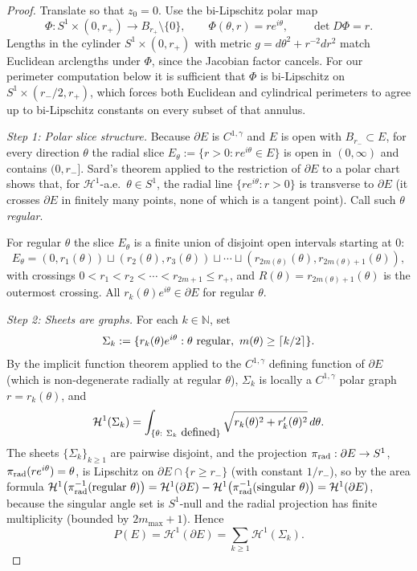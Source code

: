 \documentclass[11pt]{amsart}
\newcommand{\N}{\mathbb N}
\newcommand{\HH}{\mathcal H}
\begin{document}
\begin{proof}
Translate so that \(z_0=0\).  Use the bi-Lipschitz polar map
\[
   \Phi:S^1\times(0,r_+)\to B_{r_+}\setminus\{0\},
   \qquad
   \Phi(\theta,r)=re^{i\theta},
   \qquad
   \det D\Phi=r.
\]
Lengths in the cylinder \(S^1\times(0,r_+)\) with metric
\(g=d\theta^2+r^{-2}dr^2\) match Euclidean arclengths under \(\Phi\),
since the Jacobian factor cancels.  For our perimeter computation
below it is sufficient that \(\Phi\) is bi-Lipschitz on
\(S^1\times(r_-/2,r_+)\), which forces both Euclidean and cylindrical
perimeters to agree up to bi-Lipschitz constants on every subset of
that annulus.

\emph{Step 1: Polar slice structure.}  Because \(\partial E\) is
\(C^{1,\gamma}\) and \(E\) is open with \(B_{r_-}\subset E\), for every
direction \(\theta\) the radial slice \(E_\theta:=
\{r>0:re^{i\theta}\in E\}\) is open in \((0,\infty)\) and contains
\((0,r_-]\).  Sard's theorem applied to the restriction of \(\partial
E\) to a polar chart shows that, for \(\HH^1\)-a.e.\
\(\theta\in S^1\), the radial line \(\{re^{i\theta}:r>0\}\) is
transverse to \(\partial E\) (it crosses \(\partial E\) in finitely
many points, none of which is a tangent point).  Call such \(\theta\)
\emph{regular}.

For regular \(\theta\) the slice \(E_\theta\) is a finite union of
disjoint open intervals starting at \(0\):
\[
   E_\theta=(0,r_1(\theta))\sqcup(r_2(\theta),r_3(\theta))\sqcup
       \cdots\sqcup(r_{2m(\theta)}(\theta),r_{2m(\theta)+1}(\theta)),
\]
with crossings \(0<r_1<r_2<\cdots<r_{2m+1}\le r_+\), and \(R(\theta)=
r_{2m(\theta)+1}(\theta)\) is the outermost crossing.  All
\(r_k(\theta)e^{i\theta}\in\partial E\) for regular \(\theta\).

\emph{Step 2: Sheets are graphs.}  For each \(k\in\N\), set
\[
   \Sigma_k:=\{r_k(\theta)e^{i\theta}:
      \theta\hbox{ regular},\ m(\theta)\ge\lceil k/2\rceil\}.
\]
By the implicit function theorem applied to the \(C^{1,\gamma}\) defining
function of \(\partial E\) (which is non-degenerate radially at
regular \(\theta\)), \(\Sigma_k\) is locally a \(C^{1,\gamma}\) polar graph
\(r=r_k(\theta)\), and
\[
   \HH^1(\Sigma_k)=\int_{\{\theta:\ \Sigma_k\hbox{ defined}\}}
      \sqrt{r_k(\theta)^2+r_k'(\theta)^2}\,d\theta.
\]
The sheets \(\{\Sigma_k\}_{k\ge 1}\) are pairwise disjoint, and the
projection \(\pi_{\rm rad}:\partial E\to S^1\),
\(\pi_{\rm rad}(re^{i\theta})=\theta\), is Lipschitz on
\(\partial E\cap\{r\ge r_-\}\) (with constant \(1/r_-\)), so by the
area formula
\(\HH^1\bigl(\pi_{\rm rad}^{-1}(\hbox{regular }\theta)\bigr)=
\HH^1(\partial E)-\HH^1\bigl(\pi_{\rm rad}^{-1}(\hbox{singular }
\theta)\bigr)=\HH^1(\partial E)\), because the singular angle set is
\(S^1\)-null and the radial projection has finite multiplicity
(bounded by \(2m_{\max}+1\)).  Hence
\begin{equation}\label{eq:sheet-PE}
   P(E)=\HH^1(\partial E)=\sum_{k\ge 1}\HH^1(\Sigma_k).
\end{equation}


\end{proof}
\end{document}
